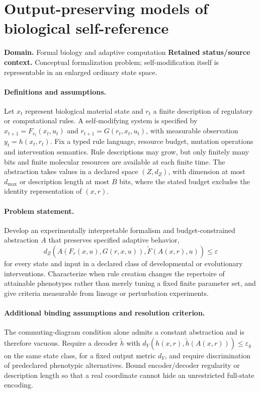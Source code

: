 \documentclass[11pt]{article}
\begin{document}
\section*{Output-preserving models of biological self-reference}
\label{prob:059}
\label{rank:269}
\par\smallskip

\noindent\textbf{Domain.} Formal biology and adaptive computation \quad \textbf{Retained status/source context.} Conceptual formalization problem; self-modification itself is representable in an enlarged ordinary state space.
\paragraph{Definitions and assumptions.} Let $x_t$ represent biological material state and $r_t$ a finite description of regulatory or computational rules. A self-modifying system is specified by $x_{t+1}=F_{r_t}(x_t,u_t)$ and $r_{t+1}=G(r_t,x_t,u_t)$, with measurable observation $y_t=h(x_t,r_t)$. Fix a typed rule language, resource budget, mutation operations and intervention semantics. Rule descriptions may grow, but only finitely many bits and finite molecular resources are available at each finite time. The abstraction takes values in a declared space $(Z,d_Z)$, with dimension at most $d_{\max}$ or description length at most $B$ bits, where the stated budget excludes the identity representation of $(x,r)$.
\paragraph{Problem statement.} Develop an experimentally interpretable formalism and budget-constrained abstraction $A$ that preserves specified adaptive behavior,
\[d_Z\!\left(A(F_r(x,u),G(r,x,u)),\widetilde F(A(x,r),u)\right)\le\varepsilon\]
for every state and input in a declared class of developmental or evolutionary interventions. Characterize when rule creation changes the repertoire of attainable phenotypes rather than merely tuning a fixed finite parameter set, and give criteria measurable from lineage or perturbation experiments.
\paragraph{Additional binding assumptions and resolution criterion.} The commuting-diagram condition alone admits a constant abstraction and is therefore vacuous. Require a decoder $\widetilde h$ with $d_Y(h(x,r),\widetilde h(A(x,r)))\leq\varepsilon_y$ on the same state class, for a fixed output metric $d_Y$, and require discrimination of predeclared phenotypic alternatives. Bound encoder/decoder regularity or description length so that a real coordinate cannot hide an unrestricted full-state encoding.
\end{document}

